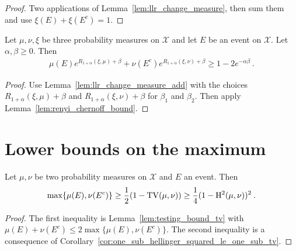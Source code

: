 \begin{proof}\leanok
{}
Two applications of Lemma~\ref{lem:llr_change_measure}, then sum them and use $\xi(E)+\xi(E^c) = 1$.
\end{proof}

\begin{lemma}
  \label{lem:renyi_change_measure_add}
  \leanok
  Let $\mu, \nu, \xi$ be three probability measures on $\mathcal X$ and let $E$ be an event on $\mathcal X$. Let $\alpha, \beta \ge 0$. Then
  \begin{align*}
  \mu(E) e^{R_{1+\alpha}(\xi, \mu) + \beta} + \nu(E^c) e^{R_{1+\alpha}(\xi, \nu) + \beta} \ge 1 - 2 e^{-\alpha \beta} \: .
  \end{align*}
\end{lemma}

\begin{proof}\leanok
{}
Use Lemma~\ref{lem:llr_change_measure_add} with the choices $R_{1+\alpha}(\xi, \mu) + \beta$ and $R_{1+\alpha}(\xi, \nu) + \beta$ for $\beta_1$ and $\beta_2$.
Then apply Lemma~\ref{lem:renyi_chernoff_bound}.
\end{proof}


\section{Lower bounds on the maximum}

\begin{lemma}
  \label{lem:testing_bound_tv_hellinger_max}
  Let $\mu, \nu$ be two probability measures on $\mathcal X$ and $E$ an event. Then
  \begin{align*}
  \max\{\mu(E), \nu(E^c)\}
  \ge \frac{1}{2}(1 - \operatorname{TV}(\mu, \nu))
  \ge \frac{1}{4}(1 - \operatorname{H^2}(\mu, \nu))^2
  \: .
  \end{align*}
\end{lemma}

\begin{proof}
The first inequality is Lemma~\ref{lem:testing_bound_tv} with $\mu(E) + \nu(E^c) \le 2 \max\{\mu(E), \nu(E^c)\}$.
The second inequality is a consequence of Corollary~\ref{cor:one_sub_hellinger_squared_le_one_sub_tv}.
\end{proof}

